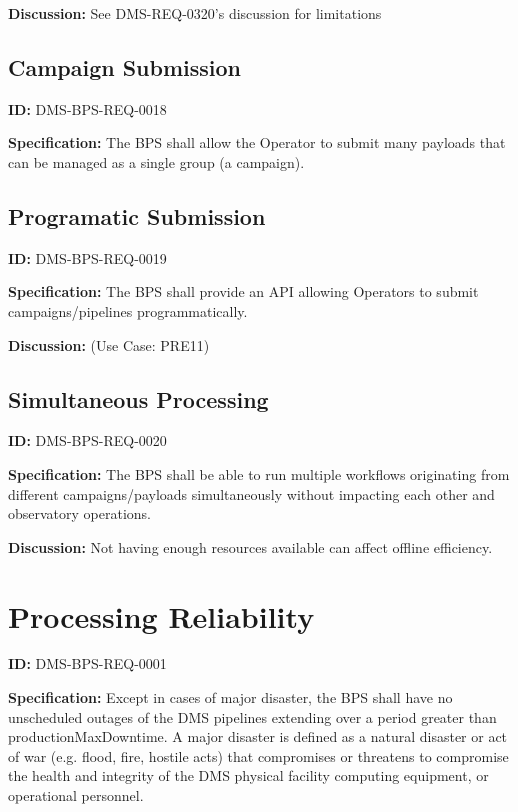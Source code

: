 \documentclass[SE,toc,lsstdraft]{lsstdoc}
\begin{document}
\textbf{Discussion:}
See DMS-REQ-0320’s discussion for limitations

\subsection{Campaign Submission}

\label{DMS-BPS-REQ-0018}
\textbf{ID:} DMS-BPS-REQ-0018

\textbf{Specification:}
The BPS shall allow the Operator to submit many payloads that can be managed as a single group (a campaign).

\subsection{Programatic Submission}

\label{DMS-BPS-REQ-0019}
\textbf{ID:} DMS-BPS-REQ-0019

\textbf{Specification:}
The BPS shall provide an API allowing Operators to submit campaigns/pipelines programmatically.

\textbf{Discussion:}
(Use Case: PRE11)

\subsection{Simultaneous Processing}

\label{DMS-BPS-REQ-0020}
\textbf{ID:} DMS-BPS-REQ-0020

\textbf{Specification:}
The BPS shall be able to run multiple workflows originating from different campaigns/payloads simultaneously without impacting each other and observatory operations.

\textbf{Discussion:}
Not having enough resources available can affect offline efficiency.

\section{Processing Reliability}

\label{DMS-BPS-REQ-0001}
\textbf{ID:} DMS-BPS-REQ-0001

\textbf{Specification:}
Except in cases of major disaster, the BPS shall have no unscheduled outages of the DMS pipelines extending over a period greater than productionMaxDowntime. A major disaster is defined as a natural disaster or act of war (e.g. flood, fire, hostile acts) that compromises or threatens to compromise the health and integrity of the DMS physical facility computing equipment, or operational personnel.
\end{document}
